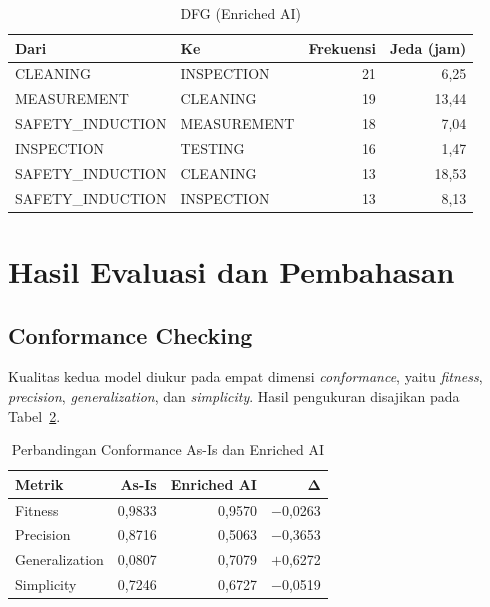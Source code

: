 \begin{table}[H]
\centering
\caption{DFG (Enriched AI)}
\label{tab:dfg-teratas}
\footnotesize
\setlength{\tabcolsep}{5pt}
\renewcommand{\arraystretch}{1.05}
\begin{tabular}{@{}l l r r@{}}
\toprule
\textbf{Dari} & \textbf{Ke} & \textbf{Frekuensi} & \textbf{Jeda (jam)} \\
\midrule
CLEANING & INSPECTION & 21 & 6,25 \\
MEASUREMENT & CLEANING & 19 & 13,44 \\
SAFETY\_INDUCTION & MEASUREMENT & 18 & 7,04 \\
INSPECTION & TESTING & 16 & 1,47 \\
SAFETY\_INDUCTION & CLEANING & 13 & 18,53 \\
SAFETY\_INDUCTION & INSPECTION & 13 & 8,13 \\
\bottomrule
\end{tabular}
\end{table}


\section{Hasil Evaluasi dan Pembahasan}

\subsection{Conformance Checking}

Kualitas kedua model diukur pada empat dimensi \textit{conformance}, yaitu \textit{fitness}, \textit{precision}, \textit{generalization}, dan \textit{simplicity}. Hasil pengukuran disajikan pada Tabel~\ref{tab:perbandingan-conformance}.

\begin{table}[H]
\centering
\caption{Perbandingan Conformance As-Is dan Enriched AI}
\label{tab:perbandingan-conformance}
\footnotesize
\setlength{\tabcolsep}{6pt}
\renewcommand{\arraystretch}{1.05}
\begin{tabular}{@{}l r r r@{}}
\toprule
\textbf{Metrik} & \textbf{As-Is} & \textbf{Enriched AI} & $\boldsymbol{\Delta}$ \\
\midrule
Fitness & 0,9833 & 0,9570 & $-$0,0263 \\
Precision & 0,8716 & 0,5063 & $-$0,3653 \\
Generalization & 0,0807 & 0,7079 & $+$0,6272 \\
Simplicity & 0,7246 & 0,6727 & $-$0,0519 \\
\bottomrule
\end{tabular}
\end{table}

